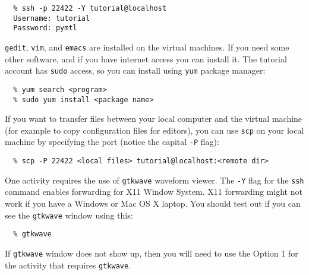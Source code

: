 \documentclass[11pt]{article}
\begin{document}
\vspace{-0.1in}
\begin{verbatim}
  % ssh -p 22422 -Y tutorial@localhost
  Username: tutorial
  Password: pymtl
\end{verbatim}
\vspace{-0.1in}

\texttt{gedit}, \texttt{vim}, and \texttt{emacs} are installed on the
virtual machines. If you need some other software, and if you have
internet access you can install it.  The tutorial account has
\texttt{sudo} access, so you can install using \texttt{yum} package
manager:

\vspace{-0.1in}
\begin{verbatim}
  % yum search <program>
  % sudo yum install <package name>
\end{verbatim}
\vspace{-0.1in}

If you want to transfer files between your local computer and the virtual
machine (for example to copy configuration files for editors), you can use
\texttt{scp} on your local machine by specifying the port (notice the
capital \texttt{-P} flag):

\vspace{-0.1in}
\begin{verbatim}
  % scp -P 22422 <local files> tutorial@localhost:<remote dir>
\end{verbatim}
\vspace{-0.1in}

One activity requires the use of \texttt{gtkwave} waveform viewer. The
\texttt{-Y} flag for the \texttt{ssh} command enables forwarding for X11
Window System. X11 forwarding might not work if you have a Windows or Mac
OS X laptop. You should test out if you can see the \texttt{gtkwave}
window using this:

\vspace{-0.1in}
\begin{verbatim}
  % gtkwave
\end{verbatim}
\vspace{-0.1in}

If \texttt{gtkwave} window does not show up, then you will need to use the
Option 1 for the activity that requires \texttt{gtkwave}.
\end{document}
